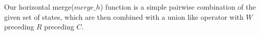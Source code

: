 Our horizontal merge($merge\_h$) function is a simple pairwise combination of the given set of states, 
which are then combined with a union like operator with $W$ preceding $R$ preceding $C$.

%


%
%
%

